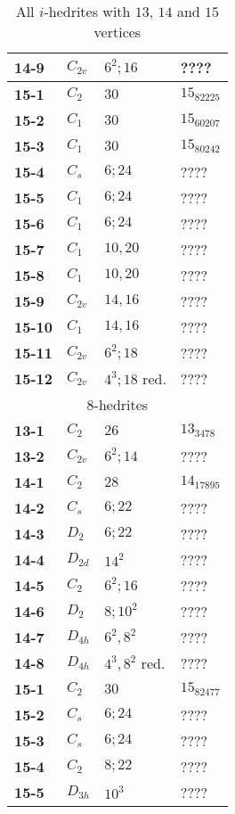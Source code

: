 \documentclass[12pt]{article}
\begin{document}
\begin{table}
\begin{center}
{\begin{minipage}[t]{7cm}
\begin{tabular}{||l|l|l|l||}
{\bf 14-9}      &$C_{2v}$       &$6^2; 16$      &????\\\hline
{\bf 15-1}      &$C_2$  &$30$   &$15_{82225}$\\
{\bf 15-2}      &$C_1$  &$30$   &$15_{60207}$\\
{\bf 15-3}      &$C_1$  &$30$   &$15_{80242}$\\
{\bf 15-4}      &$C_s$  &$6;24$ &????\\
{\bf 15-5}      &$C_1$  &$6;24$ &????\\
{\bf 15-6}      &$C_1$  &$6;24$ &????\\
{\bf 15-7}      &$C_1$  &$10,20$        &????\\
{\bf 15-8}      &$C_1$  &$10,20$        &????\\
{\bf 15-9}      &$C_{2v}$  &$14,16$ &????\\
{\bf 15-10}     &$C_1$  &$14,16$        &????\\
{\bf 15-11}     &$C_{2v}$       &$6^2; 18$      &????\\
{\bf 15-12}     &$C_{2v}$       &$4^3; 18$ red. &????\\\hline
\hline
\multicolumn{4}{||c||}{$8$-hedrites}\\\hline
{\bf 13-1}      &$C_2$  &$26$           &$13_{3478}$\\
{\bf 13-2}      &$C_{2v}$       &$6^2; 14$      &????\\\hline
{\bf 14-1}      &$C_2$  &$28$           &$14_{17895}$\\
{\bf 14-2}      &$C_s$  &$6; 22$                &????\\
{\bf 14-3}      &$D_2$  &$6; 22$                &????\\
{\bf 14-4}      &$D_{2d}$       &$14^2$         &????\\
{\bf 14-5}      &$C_2$  &$6^2; 16$      &????\\
{\bf 14-6}      &$D_2$  &$8; 10^2$      &????\\
{\bf 14-7}      &$D_{4h}$       &$6^2, 8^2$     &????\\
{\bf 14-8}      &$D_{4h}$       &$4^3, 8^2$ red.        &????\\\hline
{\bf 15-1}      &$C_2$  &$30$   &$15_{82477}$\\
{\bf 15-2}      &$C_s$  &$6; 24$        &????\\
{\bf 15-3}      &$C_s$  &$6;24$ &????\\
{\bf 15-4}      &$C_2$  &$8; 22$        &????\\
{\bf 15-5}      &$D_{3h}$       &$10^3$ &????\\\hline\hline
\end{tabular}
\end{minipage}
}
\end{center}
\caption{All $i$-hedrites with $13$, $14$ and $15$ vertices}
\label{tab:i-hedrite13_14}
\end{table}
\end{document}
